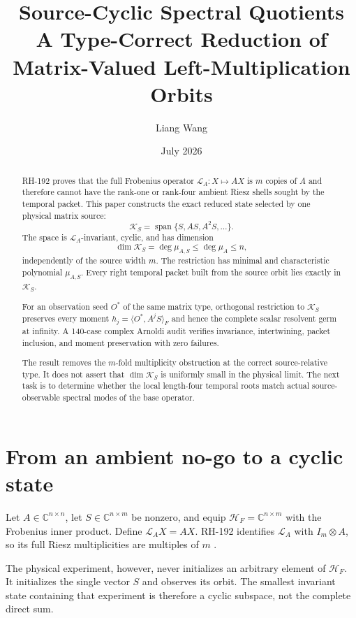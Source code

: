 \documentclass[12pt]{article}
\title{Source-Cyclic Spectral Quotients\\
\large A Type-Correct Reduction of Matrix-Valued Left-Multiplication Orbits}
\author{Liang Wang}
\date{July 2026}
\theoremstyle{remark}
\newcommand{\cH}{\mathcal H}
\newcommand{\cK}{\mathcal K}
\newcommand{\cL}{\mathcal L}
\begin{document}
\maketitle

\begin{abstract}
RH-192 proves that the full Frobenius operator
$\cL_A:X\mapsto AX$ is $m$ copies of $A$ and therefore cannot have the
rank-one or rank-four ambient Riesz shells sought by the temporal packet.
This paper constructs the exact reduced state selected by one physical
matrix source:
\[
 \cK_S=\operatorname{span}\{S,AS,A^2S,\ldots\}.
\]
The space is $\cL_A$-invariant, cyclic, and has dimension
\[
 \dim\cK_S=\deg\mu_{A,S}\le\deg\mu_A\le n,
\]
independently of the source width $m$.  The restriction has minimal and
characteristic polynomial $\mu_{A,S}$.  Every right temporal packet built
from the source orbit lies exactly in $\cK_S$.

For an observation seed $O^*$ of the same matrix type, orthogonal restriction
to $\cK_S$ preserves every moment
$h_j=\langle O^*,A^jS\rangle_F$ and hence the complete scalar resolvent germ
at infinity.  A 140-case complex Arnoldi audit verifies invariance,
intertwining, packet inclusion, and moment preservation with zero failures.

The result removes the $m$-fold multiplicity obstruction at the correct
source-relative type.  It does not assert that $\dim\cK_S$ is uniformly
small in the physical limit.  The next task is to determine whether the
local length-four temporal roots match actual source-observable spectral
modes of the base operator.
\end{abstract}

\section{From an ambient no-go to a cyclic state}

Let $A\in\mathbb C^{n\times n}$, let
$S\in\mathbb C^{n\times m}$ be nonzero, and equip
$\cH_F=\mathbb C^{n\times m}$ with the Frobenius inner product.  Define
$\cL_A X=AX$.  RH-192 identifies $\cL_A$ with $I_m\otimes A$, so its full
Riesz multiplicities are multiples of $m$ \citep{WangRH192}.

The physical experiment, however, never initializes an arbitrary element
of $\cH_F$.  It initializes the single vector $S$ and observes its orbit.
The smallest invariant state containing that experiment is therefore a
cyclic subspace, not the complete direct sum.
\end{document}
